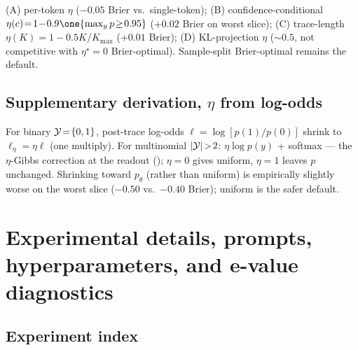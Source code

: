(A) per-token $\eta$ ($-0.05$ Brier vs.\ single-token);
(B) confidence-conditional $\eta(c)\!=\!1\!-\!0.9\one{\max_y p\!\ge\!0.95}$
($+0.02$ Brier on worst slice);
(C) trace-length $\eta(K)\!=\!1\!-\!0.5K/K_{\max}$
($+0.01$ Brier);
(D) KL-projection $\eta$ ($\sim\!0.5$, not competitive with
$\eta^\star\!=\!0$ Brier-optimal).  Sample-split Brier-optimal
remains the default.


\subsection{Supplementary derivation, $\eta$ from log-odds}
\label{app:eta-from-logodds}

For binary $\mathcal{Y}\!=\!\{0,1\}$, post-trace log-odds
$\ell\!=\!\log[p(1)/p(0)]$ shrink to $\ell_\eta\!=\!\eta\ell$
(one multiply).  For multinomial $|\mathcal{Y}|\!>\!2$:
$\eta\log p(y)$ + softmax — the $\eta$-Gibbs correction at the readout
(); $\eta\!=\!0$ gives uniform,
$\eta\!=\!1$ leaves $p$ unchanged.  Shrinking toward $p_\theta$ (rather
than uniform) is empirically slightly worse on the worst slice
($-0.50$ vs.\ $-0.40$ Brier); uniform is the safer default.



\section{Experimental details, prompts, hyperparameters, and e-value diagnostics}
\label{app:letter-G}

\subsection{Experiment index}
\label{app:experiment-index}

